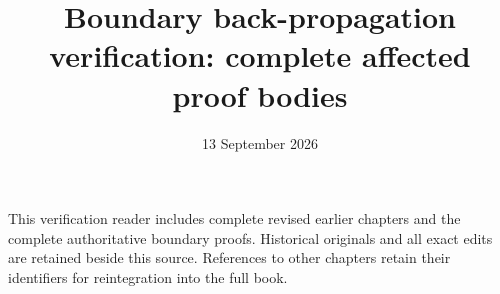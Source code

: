\documentclass[11pt,a4paper]{article}
\title{Boundary back-propagation verification: complete affected proof bodies}
\author{}\date{13 September 2026}
\theoremstyle{definition}\newtheorem{definition}[theorem]{Definition}
\theoremstyle{remark}\newtheorem{remark}[theorem]{Remark}
\begin{document}
\maketitle
This verification reader includes complete revised earlier chapters and
the complete authoritative boundary proofs. Historical originals and
all exact edits are retained beside this source. References to other
chapters retain their identifiers for reintegration into the full book.

\end{document}
